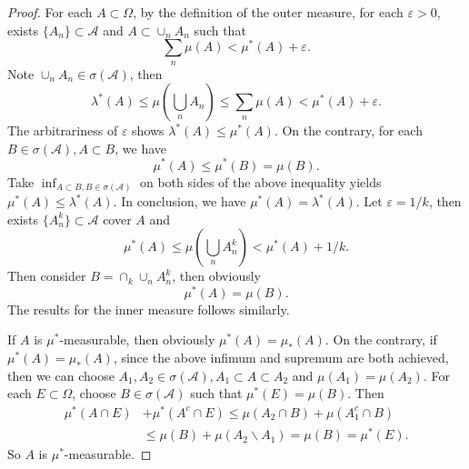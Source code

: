\documentclass[12pt]{article}
\renewcommand{\(}{\left(}%
\renewcommand{\)}{\right)}%
\renewcommand{\[}{\left[}%
\renewcommand{\]}{\right]}%
\renewcommand{\a}{\mathscr{A}}
\newtheorem{proof}{Proof.}}
\begin{document}
  \begin{proof}
   For each $A\subset \Omega$, by the definition of the outer measure, for each $\varepsilon>0$, exists $\{A_n\}\subset\a$ and $A\subset\cup_n A_n$ such that
   \begin{equation*}
    \sum_{n}\mu(A)<  \mu^*(A)+\varepsilon.
   \end{equation*}
   Note $\cup_n A_n\in\sigma(\a)$, then
   \begin{equation*}
    \lambda^*(A)\leq \mu\(\bigcup_n A_n \)\leq \sum_{n}\mu(A)<  \mu^*(A)+\varepsilon.
   \end{equation*}
   The arbitrariness of $\varepsilon$ shows $\lambda^*(A)\leq \mu^*(A)$. On the contrary, for each $B\in\sigma(\a),A\subset B$, we have
   \begin{equation*}
    \mu^*(A)\leq \mu^*(B)=\mu(B).
   \end{equation*}
   Take $\inf_{A\subset B,B\in\sigma(\a)}$ on both sides of the above inequality yields $\mu^*(A)\leq \lambda^*(A)$. In conclusion, we have $\mu^*(A)=\lambda^*(A)$. Let $\varepsilon=1/k$, then exists $\{A_n^k\}\subset \a$ cover $A$ and
   \begin{equation*}
    \mu^*(A)\leq \mu\(\bigcup_n A_n^k \)<\mu^*(A)+1/k.
   \end{equation*}
   Then consider $B=\cap_k\cup_n A_n^k$, then obviously
   \begin{equation*}
    \mu^*(A)=\mu(B).
   \end{equation*}
   The results for the inner measure follows similarly.

   If $A$ is $\mu^*$-measurable, then obviously $\mu^*(A)=\mu_*(A)$. On the contrary, if $\mu^*(A)=\mu_*(A)$, since the above infimum and supremum are both achieved, then we can choose $A_1,A_2\in\sigma(\a),A_1\subset A\subset A_2$ and $\mu(A_1)=\mu(A_2)$. For each $E\subset\Omega$, choose $B\in\sigma(\a)$ such that $\mu^*(E)=\mu(B)$. Then
   \begin{equation*}
    \begin{split}
     \mu^*(A\cap E)&+\mu^*(A^c\cap E)\leq \mu(A_2\cap B)+\mu(A_1^c\cap B)\\
     &\leq \mu(B)+\mu(A_2\backslash A_1 )=\mu(B)=\mu^*(E).
    \end{split}
   \end{equation*}
   So $A$  is $\mu^*$-measurable.
  \end{proof}
  
\end{document}
